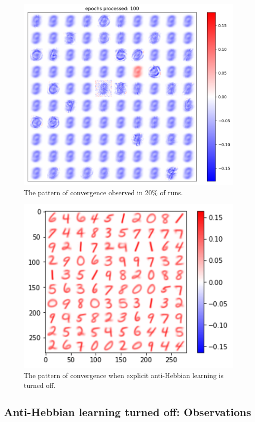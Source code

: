 \documentclass[a4paper]{report}
\begin{document}
\begin{figure} [H]
    \centering
    \includegraphics [width=12cm ] {h/nove.png}
    \caption{The pattern of convergence observed in 20\% of runs.}
    \label{nove}
\end{figure}

\begin{figure} [H]
    \centering
    \includegraphics [width=12cm ] {h/nodelta.png}
    \caption{The pattern of convergence when explicit anti-Hebbian learning is turned off.}
    \label{nodelta}
\end{figure}

\subsection{Anti-Hebbian learning turned off: Observations}
\end{document}
